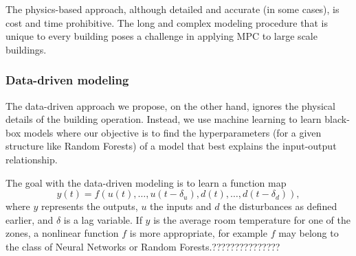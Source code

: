 \textcolor[rgb]{0,0,1}{The physics-based approach, although detailed and accurate (in some cases), is cost and time prohibitive. The long and complex modeling procedure that is unique to every building poses a challenge in applying MPC to large scale buildings.}

\subsubsection{Data-driven modeling}
\textcolor[rgb]{0,0,1}{The data-driven approach we propose, on the other hand, ignores the physical details of the building operation. Instead, we use machine learning to learn black-box models where our objective is to find the hyperparameters (for a given structure like Random Forests) of a model that best explains the input-output relationship.}

\textcolor[rgb]{0,0,1}{The goal with the data-driven modeling is to learn a function map
\begin{equation}
y(t) = f(u(t),\dots,u(t-\delta_u), d(t),\dots, d(t-\delta_d)),
\end{equation}
where \(y\) represents the outputs, \(u\) the inputs and \(d\) the disturbances as defined earlier, and \(\delta\) is a lag variable. If \(y\) is the average room temperature for one of the zones, a nonlinear function \(f\) is more appropriate, for example \(f\) may belong to the class of Neural Networks or Random Forests.\textcolor[rgb]{1,0,0}{???????????????}}

